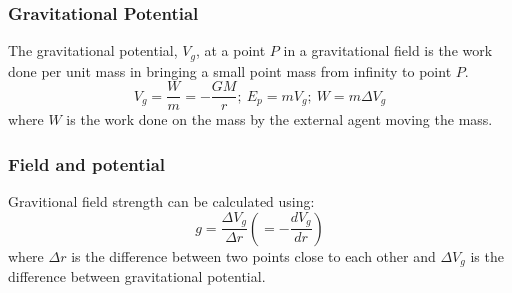 \subsubsection*{Gravitational Potential}
The gravitational potential, $V_g$, at a point $P$ in a gravitational field is the work done per unit mass in bringing a small point mass from infinity to point $P$. 
\[V_g=\dfrac{W}{m}=-\dfrac{GM}{r};\ E_p=mV_g;\ W=m\Delta V_g\]
where $W$ is the work done on the mass by the external agent moving the mass.
\subsubsection*{Field and potential}
Gravitional field strength can be calculated using:
\[g=\dfrac{\Delta V_g}{\Delta r}\left(=-\dfrac{dV_g}{dr}\right)\]
where $\Delta r$ is the difference between two points close to each other and $\Delta V_g$ is the difference between gravitational potential.
